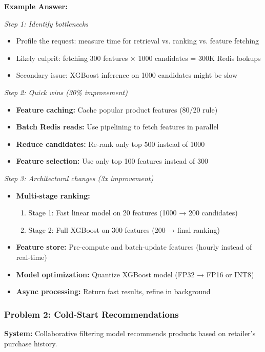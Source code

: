 \documentclass[11pt,letterpaper]{article}
\begin{document}
\textbf{Example Answer:}

\textit{Step 1: Identify bottlenecks}
\begin{itemize}
    \item Profile the request: measure time for retrieval vs. ranking vs. feature fetching
    \item Likely culprit: fetching 300 features × 1000 candidates = 300K Redis lookups
    \item Secondary issue: XGBoost inference on 1000 candidates might be slow
\end{itemize}

\textit{Step 2: Quick wins (30\% improvement)}
\begin{itemize}
    \item \textbf{Feature caching:} Cache popular product features (80/20 rule)
    \item \textbf{Batch Redis reads:} Use pipelining to fetch features in parallel
    \item \textbf{Reduce candidates:} Re-rank only top 500 instead of 1000
    \item \textbf{Feature selection:} Use only top 100 features instead of 300
\end{itemize}

\textit{Step 3: Architectural changes (3x improvement)}
\begin{itemize}
    \item \textbf{Multi-stage ranking:}
    \begin{enumerate}
        \item Stage 1: Fast linear model on 20 features (1000 → 200 candidates)
        \item Stage 2: Full XGBoost on 300 features (200 → final ranking)
    \end{enumerate}
    \item \textbf{Feature store:} Pre-compute and batch-update features (hourly instead of real-time)
    \item \textbf{Model optimization:} Quantize XGBoost model (FP32 → FP16 or INT8)
    \item \textbf{Async processing:} Return fast results, refine in background
\end{itemize}

\subsubsection{Problem 2: Cold-Start Recommendations}

\textbf{System:} Collaborative filtering model recommends products based on retailer's purchase history.
\end{document}
